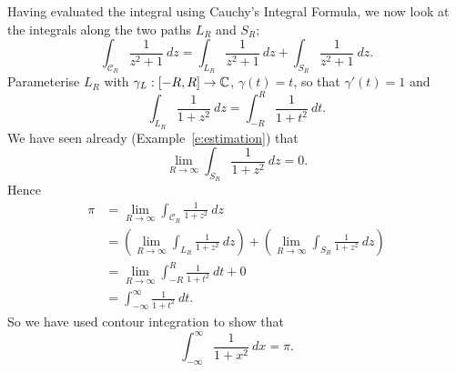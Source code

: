 Having evaluated the integral using Cauchy's Integral Formula, we now look at the integrals along the two paths $L_R$ and $S_R$;
\[
\int_{\mathcal{C}_R} \frac{1}{z^2+1}\ dz = \int_{L_R} \frac{1}{z^2+1}\ dz + \int_{S_R} \frac{1}{z^2+1}\ dz.
\]
Parameterise $L_R$ with $\gamma_L:[-R,R] \to \mathbb{C}$, $\gamma(t)=t$, so that $\gamma'(t)=1$ and
\[
\int_{L_R} \frac{1}{1+z^2}\ dz = \int_{-R}^R \frac{1}{1+t^2}\ dt.
\]
We have seen already (Example~\ref{e:estimation}) that
\[
\lim_{R \to \infty} \int_{S_R} \frac{1}{1+z^2}\ dz = 0.
\]
Hence
\begin{align*}
\pi & = \lim_{R \to \infty} \int_{\mathcal{C}_R} \frac{1}{1+z^2}\ dz \\
& = \left( \lim_{R \to \infty} \int_{L_R} \frac{1}{1+z^2}\ dz \right) +  \left( \lim_{R \to \infty} \int_{S_R} \frac{1}{1+z^2}\ dz \right)  \\
& = \lim_{R \to \infty} \int_{-R}^R \frac{1}{1+t^2}\ dt + 0 \\
& = \int_{-\infty}^{\infty} \frac{1}{1+t^2}\ dt.
\end{align*}
So we have used contour integration to show that
\[
\int_{-\infty}^{\infty} \frac{1}{1+x^2}\ dx = \pi.
\]


